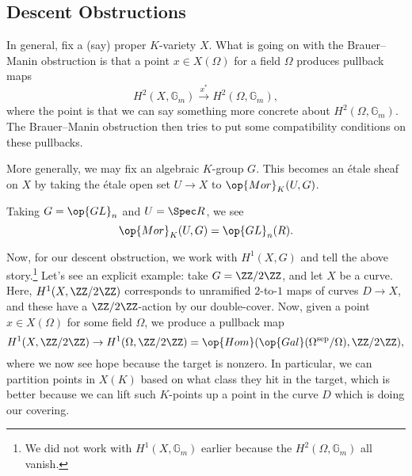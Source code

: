 \documentclass[../notes.tex]{subfiles}
\begin{document}
\subsection{Descent Obstructions}
In general, fix a (say) proper $K$-variety $X$. What is going on with the Brauer--Manin obstruction is that a point $x\in X(\Omega)$ for a field $\Omega$ produces pullback maps
\[H^2(X,\mathbb G_m)\stackrel{x^*}\to H^2(\Omega,\mathbb G_m),\]
where the point is that we can say something more concrete about $H^2(\Omega,\mathbb G_m)$. The Brauer--Manin obstruction then tries to put some compatibility conditions on these pullbacks.

More generally, we may fix an algebraic $K$-group $G$. This becomes an \'etale sheaf on $X$ by taking the \'etale open set $U\to X$ to $\op{Mor}_K(U,G)$.
\begin{example}
	Taking $G=\op{GL}_n$ and $U=\Spec R$, we see
	\[\op{Mor}_K(U,G)=\op{GL}_n(R).\]
\end{example}
Now, for our descent obstruction, we work with $H^1(X,G)$ and tell the above story.\footnote{We did not work with $H^1(X,\mathbb G_m)$ earlier because the $H^2(\Omega,\mathbb G_m)$ all vanish.} Let's see an explicit example: take $G=\ZZ/2\ZZ$, and let $X$ be a curve. Here, $H^1(X,\ZZ/2\ZZ)$ corresponds to unramified $2$-to-$1$ maps of curves $D\to X$, and these have a $\ZZ/2\ZZ$-action by our double-cover. Now, given a point $x\in X(\Omega)$ for some field $\Omega$, we produce a pullback map
\[H^1(X,\ZZ/2\ZZ)\to H^1(\Omega,\ZZ/2\ZZ)=\op{Hom}(\op{Gal}(\Omega^{\mathrm{sep}}/\Omega),\ZZ/2\ZZ),\]
where we now see hope because the target is nonzero. In particular, we can partition points in $X(K)$ based on what class they hit in the target, which is better because we can lift such $K$-points up a point in the curve $D$ which is doing our covering.
\end{document}

